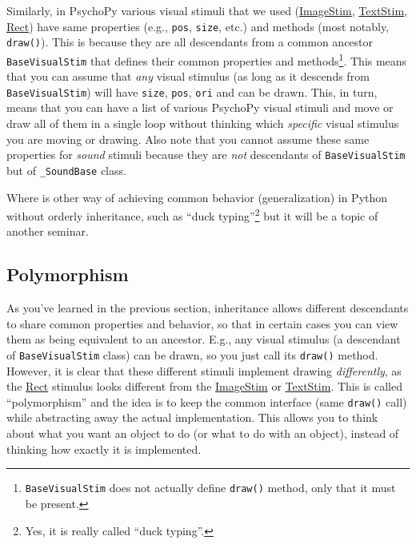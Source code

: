 \documentclass[
]{book}
\begin{document}
Similarly, in PsychoPy various visual stimuli that we used (\href{https://psychopy.org/api/visual/imagestim.html\#psychopy.visual.ImageStim}{ImageStim}, \href{https://psychopy.org/api/visual/textstim.html\#psychopy.visual.TextStim}{TextStim}, \href{https://psychopy.org/api/visual/rect.html\#psychopy.visual.rect.Rect}{Rect}) have same properties (e.g., \texttt{pos}, \texttt{size}, etc.) and methods (most notably, \texttt{draw()}). This is because they are all descendants from a common ancestor \texttt{BaseVisualStim} that defines their common properties and methods\footnote{\texttt{BaseVisualStim} does not actually define \texttt{draw()} method, only that it must be present.}. This means that you can assume that \emph{any} visual stimulus (as long as it descends from \texttt{BaseVisualStim}) will have \texttt{size}, \texttt{pos}, \texttt{ori} and can be drawn. This, in turn, means that you can have a list of various PsychoPy visual stimuli and move or draw all of them in a single loop without thinking which \emph{specific} visual stimulus you are moving or drawing. Also note that you cannot assume these same properties for \emph{sound} stimuli because they are \emph{not} descendants of \texttt{BaseVisualStim} but of \texttt{\_SoundBase} class.

Where is other way of achieving common behavior (generalization) in Python without orderly inheritance, such as ``duck typing''\footnote{Yes, it is really called ``duck typing''.} but it will be a topic of another seminar.

\hypertarget{polymorphism}{%
\subsection{Polymorphism}\label{polymorphism}}

As you've learned in the previous section, inheritance allows different descendants to share common properties and behavior, so that in certain cases you can view them as being equivalent to an ancestor. E.g., any visual stimulus (a descendant of \texttt{BaseVisualStim} class) can be drawn, so you just call its \texttt{draw()} method. However, it is clear that these different stimuli implement drawing \emph{differently}, as the \href{https://psychopy.org/api/visual/rect.html\#psychopy.visual.rect.Rect}{Rect} stimulus looks different from the \href{https://psychopy.org/api/visual/imagestim.html\#psychopy.visual.ImageStim}{ImageStim} or \href{https://psychopy.org/api/visual/textstim.html\#psychopy.visual.TextStim}{TextStim}. This is called ``polymorphism'' and the idea is to keep the common interface (same \texttt{draw()} call) while abstracting away the actual implementation. This allows you to think about what you want an object to do (or what to do with an object), instead of thinking how exactly it is implemented.
\end{document}
